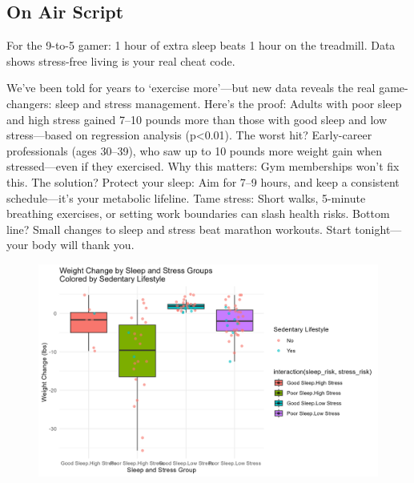 \documentclass[
  man,floatsintext]{apa6}
\begin{document}
\subsection{On Air Script}\label{on-air-script}

For the 9-to-5 gamer: 1 hour of extra sleep beats 1 hour on the treadmill. Data shows stress-free living is your real cheat code.

We've been told for years to `exercise more'---but new data reveals the real game-changers: sleep and stress management. Here's the proof: Adults with poor sleep and high stress gained 7--10 pounds more than those with good sleep and low stress---based on regression analysis (p\textless0.01). The worst hit? Early-career professionals (ages 30--39), who saw up to 10 pounds more weight gain when stressed---even if they exercised. Why this matters: Gym memberships won't fix this. The solution? Protect your sleep: Aim for 7--9 hours, and keep a consistent schedule---it's your metabolic lifeline. Tame stress: Short walks, 5-minute breathing exercises, or setting work boundaries can slash health risks. Bottom line? Small changes to sleep and stress beat marathon workouts. Start tonight---your body will thank you.

\begin{figure}
\includegraphics[width=0.9\linewidth]{../Question5/Results/Sleep_Stress_Boxplot} \caption{ }\label{fig:sleep-stress-boxplot}
\end{figure}
\end{document}
